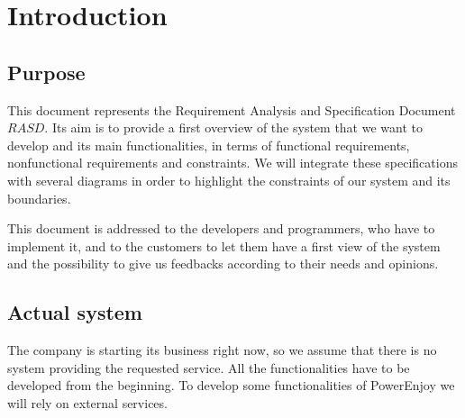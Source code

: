 \chapter{Introduction}

\section{Purpose}
This document represents the Requirement Analysis and Specification Document \(RASD\).
Its aim is to provide a first overview of the system that we want to develop and its main functionalities, in terms of functional requirements, nonfunctional requirements and constraints.
We will integrate these specifications with several diagrams in order to highlight the constraints of our system and its boundaries.

This document is addressed to the developers and programmers, who have to implement it, and to the customers to let them have a first view of the system and the possibility to give us feedbacks according to their needs and opinions.

\section{Actual system}
The company is starting its business right now, so we assume that there is no system providing the requested service.
All the functionalities have to be developed from the beginning.
To develop some functionalities of PowerEnjoy we will rely on external services.

